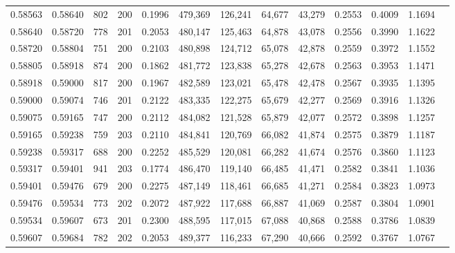 \begin{tabular}{rrrrrrrrrrrrr}
0.58563 & 0.58640 &   802 & 200 &                                     0.1996 & 479,369 & 126,241 &  64,677 &  43,279 & 0.2553 & 0.4009 & 1.1694 \\
0.58640 & 0.58720 &   778 & 201 &                                     0.2053 & 480,147 & 125,463 &  64,878 &  43,078 & 0.2556 & 0.3990 & 1.1622 \\
0.58720 & 0.58804 &   751 & 200 &                                     0.2103 & 480,898 & 124,712 &  65,078 &  42,878 & 0.2559 & 0.3972 & 1.1552 \\
0.58805 & 0.58918 &   874 & 200 &                                     0.1862 & 481,772 & 123,838 &  65,278 &  42,678 & 0.2563 & 0.3953 & 1.1471 \\
0.58918 & 0.59000 &   817 & 200 &                                     0.1967 & 482,589 & 123,021 &  65,478 &  42,478 & 0.2567 & 0.3935 & 1.1395 \\
0.59000 & 0.59074 &   746 & 201 &                                     0.2122 & 483,335 & 122,275 &  65,679 &  42,277 & 0.2569 & 0.3916 & 1.1326 \\
0.59075 & 0.59165 &   747 & 200 &                                     0.2112 & 484,082 & 121,528 &  65,879 &  42,077 & 0.2572 & 0.3898 & 1.1257 \\
0.59165 & 0.59238 &   759 & 203 &                                     0.2110 & 484,841 & 120,769 &  66,082 &  41,874 & 0.2575 & 0.3879 & 1.1187 \\
0.59238 & 0.59317 &   688 & 200 &                                     0.2252 & 485,529 & 120,081 &  66,282 &  41,674 & 0.2576 & 0.3860 & 1.1123 \\
0.59317 & 0.59401 &   941 & 203 &                                     0.1774 & 486,470 & 119,140 &  66,485 &  41,471 & 0.2582 & 0.3841 & 1.1036 \\
0.59401 & 0.59476 &   679 & 200 &                                     0.2275 & 487,149 & 118,461 &  66,685 &  41,271 & 0.2584 & 0.3823 & 1.0973 \\
0.59476 & 0.59534 &   773 & 202 &                                     0.2072 & 487,922 & 117,688 &  66,887 &  41,069 & 0.2587 & 0.3804 & 1.0901 \\
0.59534 & 0.59607 &   673 & 201 &                                     0.2300 & 488,595 & 117,015 &  67,088 &  40,868 & 0.2588 & 0.3786 & 1.0839 \\
0.59607 & 0.59684 &   782 & 202 &                                     0.2053 & 489,377 & 116,233 &  67,290 &  40,666 & 0.2592 & 0.3767 & 1.0767 \\

\end{tabular}
